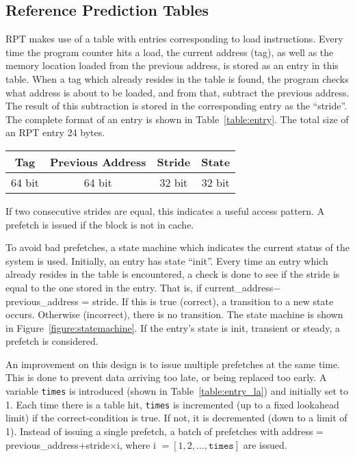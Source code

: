 \subsection{Reference Prediction Tables}

RPT makes use of a table with entries corresponding to load
instructions. Every time the program counter hits a load, the current
address (tag), as well as the memory location loaded from the previous
address, is stored as an entry in this table. When a tag which already
resides in the table is found, the program checks what address is about
to be loaded, and from that, subtract the previous address. The result
of this subtraction is stored in the corresponding entry as the
``stride''. The complete format of an entry is shown in
Table~\ref{table:entry}. The total size of an RPT entry 24 bytes.

\begin{center}
  \begin{tabular}{ | c | c | c | c |}
    \hline
    Tag & Previous Address & Stride & State \\ \hline
    64 bit & 64 bit & 32 bit & 32 bit \\ \hline
  \end{tabular}
  \label{table:entry}
\end{center}

If two consecutive strides are equal, this indicates a useful access
pattern. A prefetch is issued if the block is not in cache.

To avoid bad prefetches, a state machine which indicates the current
status of the system is used. Initially, an entry has state
``init''. Every time an entry which already resides in the table is
encountered, a check is done to see if the stride is equal to the one
stored in the entry. That is, if current\_address$ -
$previous\_address = stride. If this is true (correct), a transition
to a new state occurs. Otherwise (incorrect), there is no
transition. The state machine is shown in
Figure~\ref{figure:statemachine}. If the entry's state is init,
transient or steady, a prefetch is considered.

An improvement on this design is to issue multiple prefetches at the
same time. This is done to prevent data arriving too late, or being
replaced too early. A variable \texttt{times} is introduced (shown in
Table~\ref{table:entry_la}) and initially set to 1. Each time there is
a table hit, \texttt{times} is incremented (up to a fixed lookahead
limit) if the correct-condition is true. If not, it is decremented
(down to a limit of 1). Instead of issuing a single prefetch, a batch
of prefetches with address = previous\_address$ + $stride$\times$i,
where i $= [1, 2, \ldots, \texttt{times}]$ are issued.

